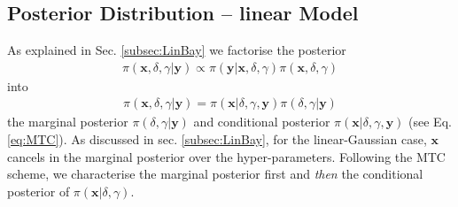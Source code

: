 \subsection{Posterior Distribution -- linear Model}
\label{sec:FirstO3Post}
As explained in Sec. \ref{subsec:LinBay} we factorise the posterior
\begin{align}
	\pi( \bm{x}, \delta, \gamma| \bm{y}) \propto \pi(\bm{y}| \bm{x},\delta,\gamma) \pi( \bm{x},  \delta,\gamma)
\end{align}
into 
\begin{align}
	\pi( \bm{x},  \delta,\gamma| \bm{y}) =\pi( \bm{x}| \delta,\gamma, \bm{y})\pi( \delta,\gamma | \bm{y})
\end{align}
the marginal posterior $\pi(\delta ,\gamma| \bm{y})$ and conditional posterior $\pi( \bm{x}| \delta,\gamma, \bm{y})$ (see Eq. \ref{eq:MTC}).
As discussed in sec. \ref{subsec:LinBay}, for the linear-Gaussian case, $\bm{x}$ cancels in the marginal posterior over the hyper-parameters.
Following the MTC scheme, we characterise the marginal posterior first and \textit{then} the conditional posterior of $\pi(\bm{x} | \delta,\gamma)$.

